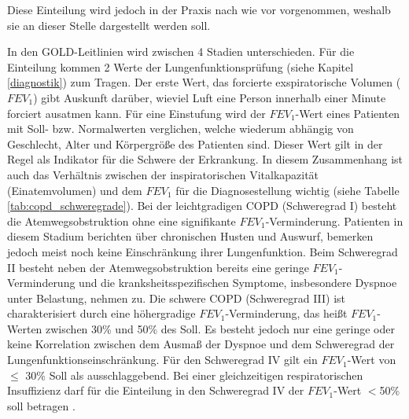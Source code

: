 Diese Einteilung wird jedoch in der Praxis nach wie vor vorgenommen, weshalb sie an dieser Stelle dargestellt werden soll.

In den GOLD-Leitlinien wird zwischen 4 Stadien unterschieden. Für die Einteilung kommen 2 Werte der Lungenfunktionsprüfung (siehe Kapitel \ref{diagnostik}) zum Tragen. Der erste Wert, das forcierte exspiratorische Volumen ($FEV_{1}$) gibt Auskunft darüber, wieviel Luft eine Person innerhalb einer Minute forciert ausatmen kann. Für eine Einstufung wird der $FEV_{1}$-Wert eines Patienten mit Soll- bzw. Normalwerten verglichen, welche wiederum abhängig von Geschlecht, Alter und Körpergröße des Patienten sind. Dieser Wert gilt in der Regel als Indikator für die Schwere der Erkrankung. In diesem Zusammenhang ist auch das Verhältnis zwischen der inspiratorischen Vitalkapazität (Einatemvolumen) und dem $FEV_{1}$ für die Diagnosestellung wichtig (siehe Tabelle \ref{tab:copd_schweregrade}). Bei der leichtgradigen COPD (Schweregrad I) besteht die Atemwegsobstruktion ohne eine signifikante $FEV_{1}$-Verminderung. Patienten in diesem Stadium berichten über chronischen Husten und Auswurf, bemerken jedoch meist noch keine Einschränkung ihrer Lungenfunktion. Beim Schweregrad II besteht neben der Atemwegsobstruktion bereits eine geringe $FEV_{1}$- Verminderung und die kranksheitsspezifischen Symptome, insbesondere Dyspnoe unter Belastung, nehmen zu. Die schwere COPD (Schweregrad III) ist charakterisiert durch eine höhergradige $FEV_{1}$-Verminderung, das heißt $FEV_{1}$-Werten zwischen 30\% und 50\% des Soll. Es besteht jedoch nur eine geringe oder keine Korrelation zwischen dem Ausmaß der Dyspnoe und dem Schweregrad der Lungenfunktionseinschränkung. Für den Schweregrad IV gilt ein $FEV_{1}$-Wert von $\leq$ 30\% Soll als ausschlaggebend. Bei einer gleichzeitigen respiratorischen Insuffizienz darf für die Einteilung in den Schweregrad IV der $FEV_{1}$-Wert $<$50\% soll betragen \autocite[vgl.][e8]{vogelmeier2007}.

